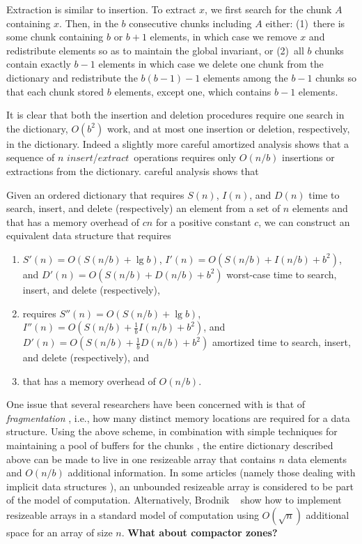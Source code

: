 \documentclass{DIKU-article}
\newcommand{\Insert}{\mbox{$\mathit{insert}$}}
\newcommand{\Extract}{\mbox{$\mathit{extract}$}}
\begin{document}
Extraction is similar to insertion. To extract $x$, we first search for
the chunk $A$ containing $x$. Then, in the $b$ consecutive chunks
including $A$ either: (1)~there is some chunk containing $b$ or $b+1$
elements, in which case we remove $x$ and redistribute elements so as
to maintain the global invariant, or (2)~all $b$ chunks contain
exactly $b-1$ elements in which case we delete one chunk from the
dictionary and redistribute the $b(b-1)-1$ elements among the $b-1$
chunks so that each chunk stored $b$ elements, except one, which
contains $b-1$ elements.

It is clear that both the insertion and deletion procedures require
one search in the dictionary, $O(b^2)$ work, and at most one insertion
or deletion, respectively, in the dictionary.  Indeed a slightly more
careful amortized analysis shows that a sequence of $n$
\Insert/\Extract\ operations requires only $O(n/b)$ insertions or
extractions from the dictionary.  careful analysis shows that

\begin{theorem}
\label{theorem:elementary-a}
Given an ordered dictionary that requires $S(n)$, $I(n)$, and $D(n)$
time to search, insert, and delete (respectively) an element from a
set of $n$ elements and that has a memory overhead of $cn$ for a
positive constant $c$, we can construct an equivalent data structure
that requires 
\begin{enumerate}
\item $S'(n)=O(S(n/b)+\lg b)$, $I'(n)=O(S(n/b)+I(n/b)+b^2)$,
and $D'(n)=O(S(n/b)+D(n/b)+b^2)$ worst-case time to search, insert,
and delete (respectively), 
\item requires $S''(n)=O(S(n/b)+\lg b)$,
$I''(n)=O(S(n/b)+\frac{1}{b}I(n/b)+b^2)$, and
$D'(n)=O(S(n/b)+\frac{1}{b}D(n/b)+b^2)$ amortized time to search,
insert, and delete (respectively), and 
\item that has a memory overhead of
$O(n/b)$.
\end{enumerate}
\end{theorem}

One issue that several researchers have been concerned with is that of
\emph{fragmentation} \cite{X}, i.e., how many distinct memory
locations are required for a data structure.  Using the above scheme,
in combination with simple techniques for maintaining a pool of
buffers for the chunks \cite{X}, the entire dictionary described above
can be made to live in one resizeable array that contains $n$ data
elements and $O(n/b)$ additional information.  In some articles
(namely those dealing with implicit data structures \cite{X,X,X,X}),
an unbounded resizeable array is considered to be part of the model of
computation. Alternatively, Brodnik \etal\ \cite{bXX} show how to
implement resizeable arrays in a standard model of computation using
$O(\sqrt{n})$ additional space for an array of size $n$. 
\textbf{What about compactor zones?}
\end{document}
